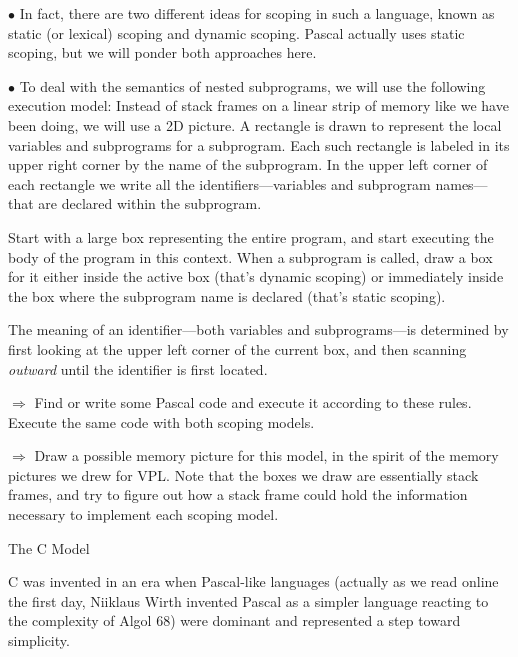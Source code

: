   \item{$\bullet$} In fact, there are two different ideas for scoping in such a language, known
  as static (or lexical) scoping and dynamic scoping.   Pascal actually uses static scoping, but we will
  ponder both approaches here.
  \medskip

  \item{$\bullet$}  To deal with the semantics of  nested subprograms, we will use the
  following execution model:
  \medskip
  \In
    Instead of stack frames on a linear strip of memory like we have been doing,
    we will use a 2D picture.  A rectangle is drawn to represent the local variables and
    subprograms for a subprogram.  Each such rectangle is labeled in its upper right
    corner by the name of the subprogram.
    In the upper left corner of each
    rectangle we write all the identifiers---variables and subprogram names---that are
    declared within the subprogram.
    \medskip
    
    Start with a large box representing the entire program, and
  start executing the body of the program in this context.  When a subprogram is called,
  draw a box for it either inside the active box (that's dynamic scoping) or immediately
  inside the box where the subprogram name is declared (that's static scoping).
  \medskip
  
  The meaning of an identifier---both variables and subprograms---is determined 
  by first looking at the upper left corner of
  the current box, and then scanning {\it outward\/} until the identifier is first located.
  \medskip

  \item{$\Rightarrow$\quad}  Find or write some Pascal code and execute it according to these
  rules.  Execute the same code with both scoping models.
  \medskip
  
  \item{$\Rightarrow$\quad} Draw a possible memory picture for this model, in the spirit of the
  memory pictures we drew for VPL.  Note that the boxes we draw are essentially
  stack frames,
  and try to figure out how a stack frame could hold the
  information necessary to implement each scoping model.  
  \border
  \Out

{\bigboldfont The C Model}
\medskip

  C was invented in an era when
  Pascal-like languages (actually as we read online the first day, Niiklaus Wirth
  invented Pascal as a simpler language reacting to the complexity of Algol 68)
   were dominant and represented a step toward 
  simplicity.
  \medskip

